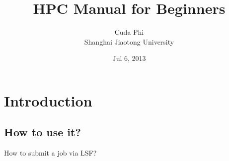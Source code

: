 \documentclass[cs4size, a4paper, openany]{hpcmanual}
\begin{document}
\title{HPC Manual for Beginners}
\author{Cuda Phi\\Shanghai Jiaotong University}
\date{Jul 6, 2013}

\maketitle

\section{Introduction}

\subsection{How to use it?}

How to submit a job via LSF?
\end{document}
